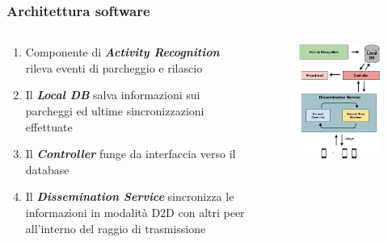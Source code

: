 \documentclass{beamer}
\begin{document}
\begin{frame}
  \frametitle{Architettura software}
  \begin{columns}
    \begin{column}{0.5\textwidth}
      \begin{enumerate}
	\item Componente di \textit{\textbf{Activity Recognition}} rileva eventi di parcheggio e rilascio
	\item Il \textit{\textbf{Local DB}} salva informazioni sui parcheggi ed ultime sincronizzazioni effettuate
	\item Il \textit{\textbf{Controller}} funge da interfaccia verso il database
	\item Il \textit{\textbf{Dissemination Service}} sincronizza le informazioni in modalità D2D con altri peer all'interno del raggio di trasmissione
      \end{enumerate}
    \end{column}

    \begin{column}{0.5\textwidth}
      \begin{figure}
	\includegraphics[scale=0.30]{img/arch_soft2.png}
      \end{figure}
    \end{column}
  \end{columns}
\end{frame}
\end{document}
